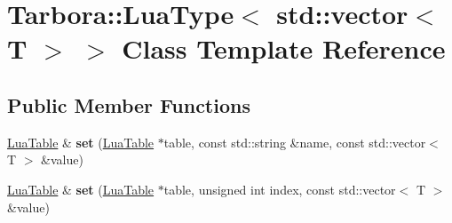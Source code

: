 \hypertarget{classTarbora_1_1LuaType_3_01std_1_1vector_3_01T_01_4_01_4}{}\section{Tarbora\+:\+:Lua\+Type$<$ std\+:\+:vector$<$ T $>$ $>$ Class Template Reference}
\label{classTarbora_1_1LuaType_3_01std_1_1vector_3_01T_01_4_01_4}
\subsection*{Public Member Functions}
\begin{DoxyCompactItemize}
\item 
\mbox{\label{classTarbora_1_1LuaType_3_01std_1_1vector_3_01T_01_4_01_4_aed8cffad5e34dd4ed1a6350de852312a}} 
\hyperlink{classTarbora_1_1LuaTable}{Lua\+Table} \& {\bfseries set} (\hyperlink{classTarbora_1_1LuaTable}{Lua\+Table} $\ast$table, const std\+::string \&name, const std\+::vector$<$ T $>$ \&value)
\item 
\mbox{\label{classTarbora_1_1LuaType_3_01std_1_1vector_3_01T_01_4_01_4_a1e459f1e4656d001dc08fdf47343e978}} 
\hyperlink{classTarbora_1_1LuaTable}{Lua\+Table} \& {\bfseries set} (\hyperlink{classTarbora_1_1LuaTable}{Lua\+Table} $\ast$table, unsigned int index, const std\+::vector$<$ T $>$ \&value)
\end{DoxyCompactItemize}
